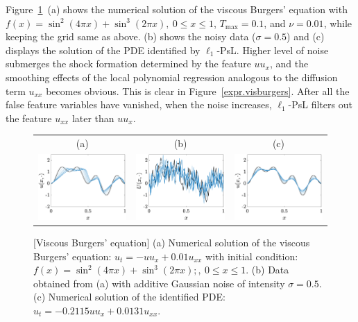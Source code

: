 \documentclass[a4paper,11pt]{article}
\begin{document}
Figure~\ref{fig.visburgers}~(a) shows the numerical solution of the viscous Burgers' equation with $f(x)=\sin^2(4\pi x)+\sin^3(2\pi x),~0\leq x\leq 1$, $T_{\max}=0.1$, and $\nu=0.01$, while keeping the grid same as above. (b) shows the noisy data ($\sigma=0.5$) and (c) displays the  solution of the PDE identified by $\ell_1$-PsL. Higher level of noise submerges the shock formation determined by the feature $uu_x$, and the smoothing effects of the local polynomial regression analogous to the diffusion term $u_{xx}$ becomes obvious. This is clear in Figure~\ref{expr.visburgers}. After all the false feature variables have vanished, when the noise increases, $\ell_1$-PsL filters out the feature $u_{xx}$ later than $uu_x$.  
\begin{figure}
\centering
\begin{tabular}{ccc}
(a)&(b)&(c)\\
\includegraphics[width=2in]{Figures/visburgers_sol.eps}&
\includegraphics[width=2in]{Figures/visburgers_noise.eps}&
\includegraphics[width=2in]{Figures/visburgers_resimul.eps}
\end{tabular}
\caption{[Viscous Burgers' equation] (a) Numerical solution of the viscous Burgers' equation: $u_t=-uu_{x}+0.01u_{xx}$ with initial condition: $f(x)=\sin^2(4\pi x)+\sin^3(2\pi x);,~0\leq x\leq 1$. (b) Data obtained from (a) with additive Gaussian noise of intensity $\sigma=0.5$. (c) Numerical solution of the identified PDE: $u_t=-0.2115uu_{x}+0.0131u_{xx}$. }	\label{fig.visburgers}
\end{figure}
\end{document}
